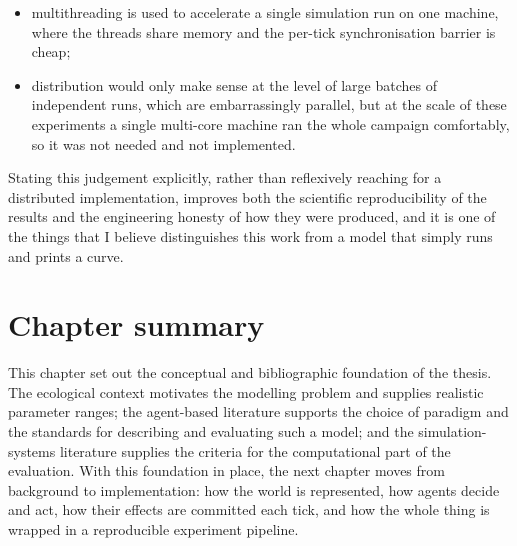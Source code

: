 \begin{itemize}
    \item multithreading is used to accelerate a single simulation run on one machine, where the threads share memory and the per-tick synchronisation barrier is cheap;
    \item distribution would only make sense at the level of large batches of independent runs, which are embarrassingly parallel, but at the scale of these experiments a single multi-core machine ran the whole campaign comfortably, so it was not needed and not implemented.
\end{itemize}

Stating this judgement explicitly, rather than reflexively reaching for a distributed implementation, improves both the scientific reproducibility of the results and the engineering honesty of how they were produced, and it is one of the things that I believe distinguishes this work from a model that simply runs and prints a curve.

\section{Chapter summary}

This chapter set out the conceptual and bibliographic foundation of the thesis. The ecological context motivates the modelling problem and supplies realistic parameter ranges; the agent-based literature supports the choice of paradigm and the standards for describing and evaluating such a model; and the simulation-systems literature supplies the criteria for the computational part of the evaluation. With this foundation in place, the next chapter moves from background to implementation: how the world is represented, how agents decide and act, how their effects are committed each tick, and how the whole thing is wrapped in a reproducible experiment pipeline.
